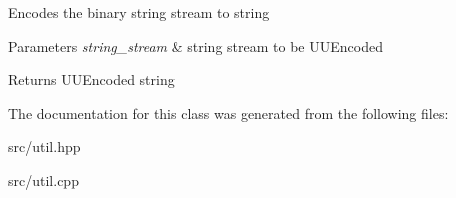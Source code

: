 Encodes the binary string stream to string


\begin{DoxyParams}{Parameters}
{\em string\+\_\+stream} & string stream to be U\+U\+Encoded \\
\hline
\end{DoxyParams}
\begin{DoxyReturn}{Returns}
U\+U\+Encoded string 
\end{DoxyReturn}


The documentation for this class was generated from the following files\+:\begin{DoxyCompactItemize}
\item 
src/util.\+hpp\item 
src/util.\+cpp\end{DoxyCompactItemize}

